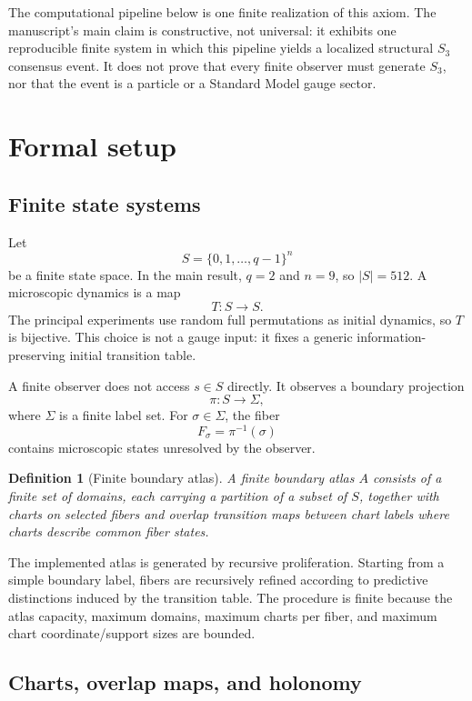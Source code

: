 \documentclass[11pt]{article}
\newtheorem{definition}{Definition}
\begin{document}
The computational pipeline below is one finite realization of this axiom.  The manuscript's
main claim is constructive, not universal: it exhibits one reproducible finite system in which
this pipeline yields a localized structural \(S_3\) consensus event.  It does not prove that
every finite observer must generate \(S_3\), nor that the event is a particle or a Standard
Model gauge sector.

\section{Formal setup}

\subsection{Finite state systems}

Let
\[
S=\{0,1,\dots,q-1\}^n
\]
be a finite state space.  In the main result, $q=2$ and $n=9$, so $|S|=512$.  A microscopic dynamics is a map
\[
T:S\to S.
\]
The principal experiments use random full permutations as initial dynamics, so $T$ is bijective.  This choice is not a gauge input: it fixes a generic information-preserving initial transition table.

A finite observer does not access $s\in S$ directly.  It observes a boundary projection
\[
\pi:S\to \Sigma,
\]
where $\Sigma$ is a finite label set.  For $\sigma\in \Sigma$, the fiber
\[
F_\sigma=\pi^{-1}(\sigma)
\]
contains microscopic states unresolved by the observer.

\begin{definition}[Finite boundary atlas]
A finite boundary atlas $A$ consists of a finite set of domains, each carrying a partition of a subset of $S$, together with charts on selected fibers and overlap transition maps between chart labels where charts describe common fiber states.
\end{definition}

The implemented atlas is generated by recursive proliferation.  Starting from a simple boundary label, fibers are recursively refined according to predictive distinctions induced by the transition table.  The procedure is finite because the atlas capacity, maximum domains, maximum charts per fiber, and maximum chart coordinate/support sizes are bounded.

\subsection{Charts, overlap maps, and holonomy}
\end{document}
